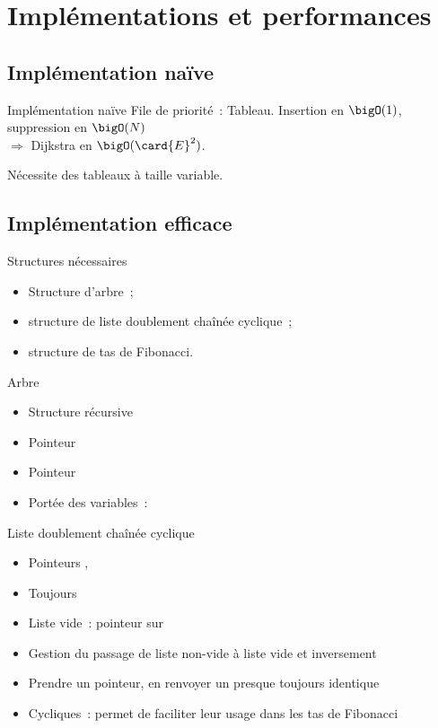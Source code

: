 \documentclass[11pt]{beamer}
\begin{document}
\section{Implémentations et performances}

\subsection{Implémentation naïve}
\begin{frame}{Implémentation naïve}
\alert{File de priorité~:} Tableau. Insertion en $\bigO(1)$, suppression en $\bigO(N)$ \\
\qquad $\Longrightarrow$ Dijkstra en $\bigO(\card{E}^2)$.

\vspace{1em}
Nécessite des \alert{tableaux à taille variable}.
\end{frame}

\subsection{Implémentation efficace}

\begin{frame}{Structures nécessaires}
\begin{itemize}
\item Structure d'\alert{arbre}~;
\item structure de \alert{liste doublement chaînée cyclique}~;
\item structure de \alert{tas de Fibonacci}.
\end{itemize}
\end{frame}

\begin{frame}{Arbre}
\begin{itemize}
\item Structure récursive
\item Pointeur 
\item Pointeur 
\item Portée des variables~: 
\end{itemize}
\end{frame}

\begin{frame}{Liste doublement chaînée cyclique}
\begin{itemize}
\item Pointeurs , 
\item Toujours 
\item Liste vide~: pointeur sur 
\item Gestion du passage de liste non-vide à liste vide et inversement
\item Prendre un pointeur, en renvoyer un presque toujours identique
\item Cycliques~: permet de faciliter leur usage dans les tas de Fibonacci
\end{itemize}
\end{frame}
\end{document}
